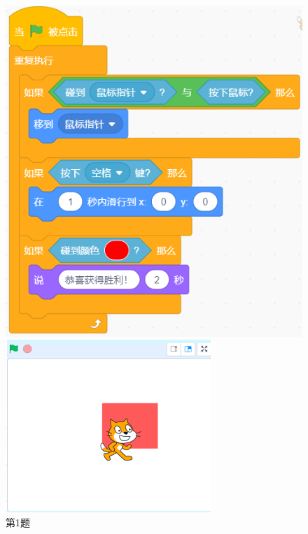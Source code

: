 \documentclass[10pt, a4paper]{article}
\begin{document}
\begin{enumerate}
        \begin{figure}[htbp]
            \centering
            \begin{minipage}[t]{.2\textwidth}
                \centering
                \includegraphics[width=1\textwidth]{1.png}
                \caption*{第1题}
            \end{minipage}
            \begin{minipage}[t]{.5\textwidth}
                \centering
                \begin{minipage}[t]{.45\textwidth}
                    \centering
                    \includegraphics[width=\textwidth]{2-1.png}

\end{minipage}
\end{minipage}
\end{figure}
\end{enumerate}
\end{document}

